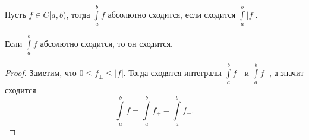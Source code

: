 \begin{definition} \thmslashn 

    Пусть $f\in C[a, b)$, тогда $\int\limits_{a}^{b} f $ абсолютно сходится, если сходится $\int\limits_{a}^{b} |f| $.
\end{definition}
\begin{theorem} \thmslashn

    Если $\int\limits_{a}^{b} f $ абсолютно сходится, то он сходится.
    \begin{proof}
        Заметим, что $0 \le f_{\pm} \le |f|$.
        Тогда сходятся интегралы $\int\limits_{a}^{b} f_{+} $ и $\int\limits_{a}^{b} f_{-} $, а значит сходится
        \[ \int\limits_{a}^{b} f = \int\limits_{a}^{b} f_{+} - \int\limits_{a}^{b} f_{-}    .\] 
    \end{proof}
\end{theorem}
